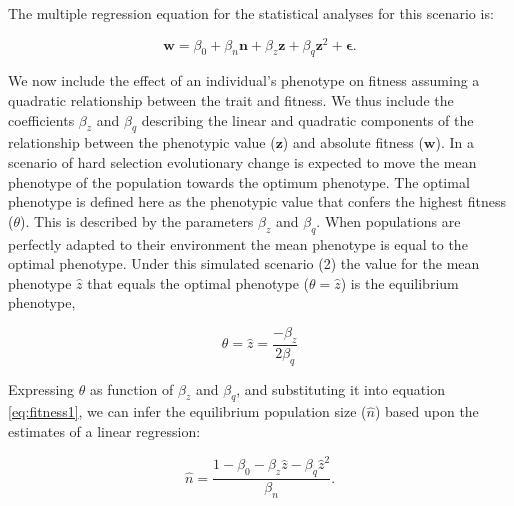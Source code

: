 \documentclass{article}
\begin{document}
The multiple regression equation for the statistical analyses for this scenario is:

\begin{equation} \label{eq:fitness1}
\bm{w}=\beta_{0} +\beta_{n} \bm{n} + \beta_{z} \bm{z} + \beta_{q} \bm{z}^2 +  \bm{\epsilon}.
\end{equation}

We now include the effect of an individual's phenotype on fitness assuming a quadratic relationship between the trait and fitness. We thus include the coefficients $\beta_{z}$ and $\beta_{q}$ describing the linear and quadratic components of the relationship between the phenotypic value ($\bm{z}$) and absolute fitness ($\bm{w}$). In a scenario of hard selection evolutionary change is expected to move the mean phenotype of the population towards the optimum phenotype. The optimal phenotype is defined here as the phenotypic value that confers the highest fitness ($\theta$). This is described by the parameters $\beta_{z}$ and $\beta_{q}$. When populations are perfectly adapted to their environment the mean phenotype is equal to the optimal phenotype. Under this simulated scenario (2) the value for the mean phenotype $\hat{z}$ that equals the optimal phenotype ($\theta=\hat{z}$) is the equilibrium phenotype,
 
\begin{equation}
\theta=\hat{z}=\frac{-\beta_{z}}{2\beta_{q}}
\end{equation}

\noindent Expressing $\theta$ as function of $\beta_{z}$ and $\beta_{q}$, and substituting it into equation \ref{eq:fitness1}, we can infer the equilibrium population size ($\hat{n}$) based upon the estimates of a linear regression:

\begin{equation}\label{eq:equilibrium1}
\hat{n}=\frac{1-\beta_{0}- \beta_{z}\hat{z} - \beta_{q}\hat{z}^2}{\beta_n}. 
\end{equation}
\end{document}

